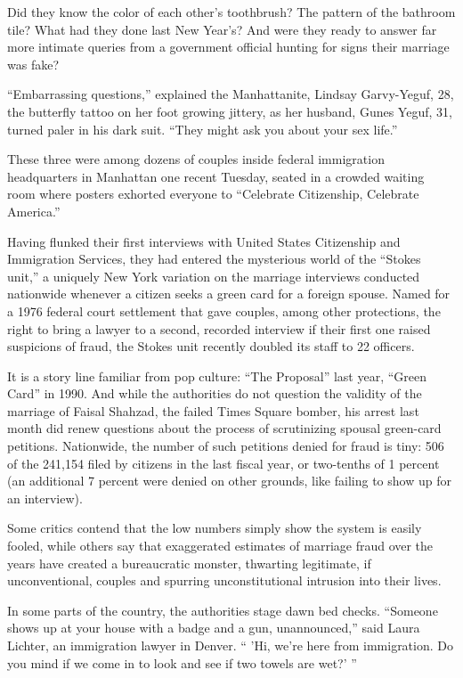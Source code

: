 ﻿\documentclass[12pt]{article}
\begin{document}
Did they know the color of each other's toothbrush? The pattern of the bathroom tile? What had they
done last New Year's? And were they ready to answer far more intimate queries from a government
official hunting for signs their marriage was fake?

``Embarrassing questions,'' explained the Manhattanite, Lindsay Garvy-Yeguf, 28, the butterfly
tattoo on her foot growing jittery, as her husband, Gunes Yeguf, 31, turned paler in his dark suit.
``They might ask you about your sex life.''

These three were among dozens of couples inside federal immigration headquarters in Manhattan one
recent Tuesday, seated in a crowded waiting room where posters exhorted everyone to ``Celebrate
Citizenship, Celebrate America.''

Having flunked their first interviews with United States Citizenship and Immigration Services, they
had entered the mysterious world of the ``Stokes unit,'' a uniquely New York variation on the
marriage interviews conducted nationwide whenever a citizen seeks a green card for a foreign spouse.
Named for a 1976 federal court settlement that gave couples, among other protections, the right to
bring a lawyer to a second, recorded interview if their first one raised suspicions of fraud, the
Stokes unit recently doubled its staff to 22 officers.

It is a story line familiar from pop culture: ``The Proposal'' last year, ``Green Card'' in 1990.
And while the authorities do not question the validity of the marriage of Faisal Shahzad, the failed
Times Square bomber, his arrest last month did renew questions about the process of scrutinizing
spousal green-card petitions. Nationwide, the number of such petitions denied for fraud is tiny: 506
of the 241,154 filed by citizens in the last fiscal year, or two-tenths of 1 percent (an additional
7 percent were denied on other grounds, like failing to show up for an interview).

Some critics contend that the low numbers simply show the system is easily fooled, while others say
that exaggerated estimates of marriage fraud over the years have created a bureaucratic monster,
thwarting legitimate, if unconventional, couples and spurring unconstitutional intrusion into their
lives.

In some parts of the country, the authorities stage dawn bed checks. ``Someone shows up at your
house with a badge and a gun, unannounced,'' said Laura Lichter, an immigration lawyer in Denver. ``
'Hi, we're here from immigration. Do you mind if we come in to look and see if two towels are wet?'
''
\end{document}
